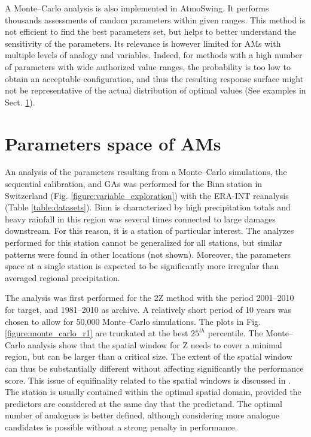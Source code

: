 \documentclass[review]{elsarticle}
\begin{document}
A Monte--Carlo analysis is also implemented in AtmoSwing. It performs thousands assessments of random parameters within given ranges. This method is not efficient to find the best parameters set, but helps to better understand the sensitivity of the parameters. Its relevance is however limited for AMs with multiple levels of analogy and variables. Indeed, for methods with a high number of parameters with wide authorized value ranges, the probability is too low to obtain an acceptable configuration, and thus the resulting response surface might not be representative of the actual distribution of optimal values (See examples in Sect. \ref{sec:parameters-space}). 



\section{Parameters space of AMs}
\label{sec:parameters-space}

An analysis of the parameters resulting from a Monte--Carlo simulations, the sequential calibration, and GAs was performed for the Binn station in Switzerland (Fig. \ref{figure:variable_exploration}) with the ERA-INT reanalysis (Table \ref{table:datasets}). Binn is characterized by high precipitation totals and heavy rainfall in this region was several times connected to large damages downstream. For this reason, it is a station of particular interest. The analyzes performed for this station cannot be generalized for all stations, but similar patterns were found in other locations (not shown). Moreover, the parameters space at a single station is expected to be significantly more irregular than averaged regional precipitation.

The analysis was first performed for the 2Z method with the period 2001--2010 for target, and 1981--2010 as archive. A relatively short period of 10 years was chosen to allow for 50,000 Monte--Carlo simulations. The plots in Fig. \ref{figure:monte_carlo_r1} are trunkated at the best $25^{th}$ percentile. The Monte--Carlo analysis show that the spatial window for Z needs to cover a minimal region, but can be larger than a critical size. The extent of the spatial window can thus be substantially different without affecting significantly the performance score. This issue of equifinality related to the spatial windows is discussed in \cite{Radanovics2013}. The station is usually contained within the optimal spatial domain, provided the predictors are considered at the same day that the predictand. The optimal number of analogues is better defined, although considering more analogue candidates is possible without a strong penalty in performance.
\end{document}
